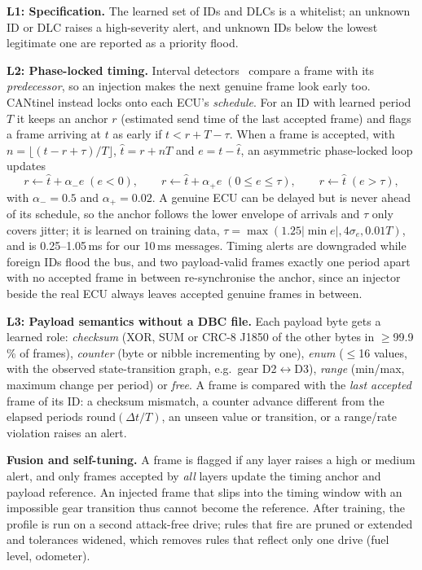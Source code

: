 \documentclass[runningheads]{llncs}
\begin{document}
\textbf{L1: Specification.} The learned set of IDs and DLCs is a whitelist; an unknown ID or DLC raises a
high-severity alert, and unknown IDs below the lowest legitimate one are reported as a priority flood.

\textbf{L2: Phase-locked timing.} Interval detectors~\cite{song2016} compare a frame with its \emph{predecessor}, so
an injection makes the next genuine frame look early too. CANtinel instead locks onto each ECU's \emph{schedule}. For an ID with learned period
$T$ it keeps an anchor $r$ (estimated send time of the last accepted frame) and flags a frame arriving at $t$ as early if
$t < r + T - \tau$. When a frame is accepted, with $n=\lfloor (t-r+\tau)/T\rfloor$, $\hat t=r+nT$ and $e=t-\hat t$, an
asymmetric phase-locked loop updates
\begin{equation}
r \leftarrow \hat t + \alpha_{-}e \;(e<0),\qquad r \leftarrow \hat t + \alpha_{+}e \;(0\le e\le\tau),\qquad r\leftarrow\hat t \;(e>\tau),
\end{equation}
with $\alpha_{-}=0.5$ and $\alpha_{+}=0.02$. A genuine ECU can be delayed but is never ahead of its schedule, so the anchor follows the lower envelope of arrivals
and $\tau$ only covers jitter; it is learned on training data, $\tau=\max(1.25|\min e|, 4\sigma_e, 0.01T)$, and is 0.25--1.05\,ms for our 10\,ms
messages. Timing alerts are downgraded while foreign IDs flood the bus, and two payload-valid frames exactly one period apart
with no accepted frame in between re-synchronise the anchor, since an injector beside the real ECU always leaves
accepted genuine frames in between.

\textbf{L3: Payload semantics without a DBC file.} Each payload byte gets a learned role: \emph{checksum} (XOR, SUM or
CRC-8 J1850 of the other bytes in $\ge$99.9\,\% of frames), \emph{counter} (byte or nibble incrementing by one),
\emph{enum} ($\le$16 values, with the observed state-transition graph, e.g.\ gear D2$\leftrightarrow$D3),
\emph{range} (min/max, maximum change per period) or \emph{free}. A frame is compared with the \emph{last accepted} frame of its ID: a checksum mismatch, a counter
advance different from the elapsed periods $\mathrm{round}(\Delta t/T)$, an unseen value or transition, or a
range/rate violation raises an alert.

\textbf{Fusion and self-tuning.} A frame is flagged if any layer raises a high or medium alert, and only frames
accepted by \emph{all} layers update the timing anchor and payload reference. An injected frame that slips into the
timing window with an impossible gear transition thus cannot become the reference. After training, the profile is run on a second attack-free drive; rules that fire are
pruned or extended and tolerances widened, which removes rules that reflect only one drive (fuel level, odometer).
\end{document}

